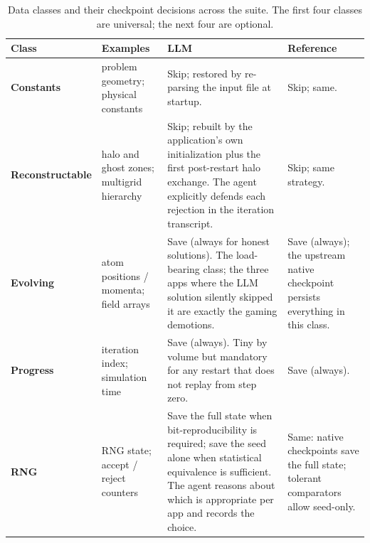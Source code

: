 \documentclass[conference]{IEEEtran}
\begin{document}
\begin{table}[t]
\centering
\caption{Data classes and their checkpoint decisions across the suite. The first four classes are universal; the next four are optional.}
\label{tab:data-classes}
\small
\setlength{\tabcolsep}{4pt}
\renewcommand{\arraystretch}{1.05}
\begin{tabular}{@{}p{2.0cm}p{4.2cm}p{4.6cm}p{4.6cm}@{}}
\toprule
Class & Examples & LLM & Reference \\
\midrule
\textbf{Constants}       & problem geometry; physical constants                & Skip; restored by re-parsing the input file at startup.                                                                                                                                                       & Skip; same.                                                                                                              \\
\midrule
\textbf{Reconstructable} & halo and ghost zones; multigrid hierarchy           & Skip; rebuilt by the application's own initialization plus the first post-restart halo exchange. The agent explicitly defends each rejection in the iteration transcript.                                     & Skip; same strategy.                                                                                                     \\
\midrule
\textbf{Evolving}        & atom positions / momenta; field arrays               & Save (always for honest solutions). The load-bearing class; the three apps where the LLM solution silently skipped it are exactly the gaming demotions.                                                       & Save (always); the upstream native checkpoint persists everything in this class.                                         \\
\midrule
\textbf{Progress}        & iteration index; simulation time                    & Save (always). Tiny by volume but mandatory for any restart that does not replay from step zero.                                                                                                              & Save (always).                                                                                                           \\
\midrule
\textbf{RNG}             & RNG state; accept / reject counters                 & Save the full state when bit-reproducibility is required; save the seed alone when statistical equivalence is sufficient. The agent reasons about which is appropriate per app and records the choice.        & Same: native checkpoints save the full state; tolerant comparators allow seed-only.                                       \\

\end{tabular}
\end{table}
\end{document}
